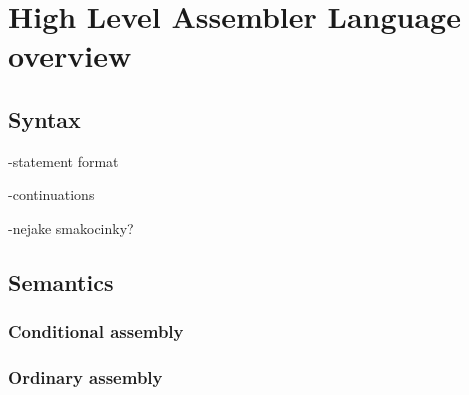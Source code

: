 \chapter{High Level Assembler Language overview}

\section{Syntax}

-statement format

-continuations

-nejake smakocinky?

\section{Semantics}

\subsection{Conditional assembly}

\subsection{Ordinary assembly}
